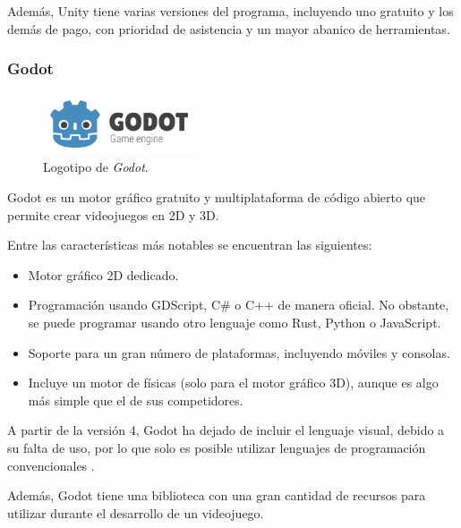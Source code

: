 Además, Unity tiene varias versiones del programa, incluyendo uno gratuito y los demás de pago, con prioridad de asistencia y un mayor abanico de herramientas.

\subsubsection{Godot}

\begin{figure}[H]
   \centering
   \includegraphics[width=0.4\textwidth]{imagenes/GODOT_LOGO.png}
   \caption{Logotipo de \textit{Godot}\cite{godot-logo}.}
\end{figure}

Godot \cite{godot} es un motor gráfico gratuito y multiplataforma de código abierto que permite crear videojuegos en 2D y 3D. 

\bigskip

Entre las características más notables se encuentran las siguientes:

\begin{itemize}
   \item Motor gráfico 2D dedicado. 
   \item Programación usando GDScript, C\# o C++ de manera oficial. No obstante, se puede programar usando otro lenguaje como Rust, Python o JavaScript. 
   \item Soporte para un gran número de plataformas, incluyendo móviles y consolas.
   \item Incluye un motor de físicas (solo para el motor gráfico 3D), aunque es algo más simple que el de sus competidores.
\end{itemize}

\bigskip 

A partir de la versión 4, Godot ha dejado de incluir el lenguaje visual, debido a su falta de uso, por lo que solo es posible utilizar lenguajes de programación convencionales \cite{godot-no-visual}.

\bigskip

Además, Godot tiene una biblioteca con una gran cantidad de recursos para utilizar durante el desarrollo de un videojuego.


